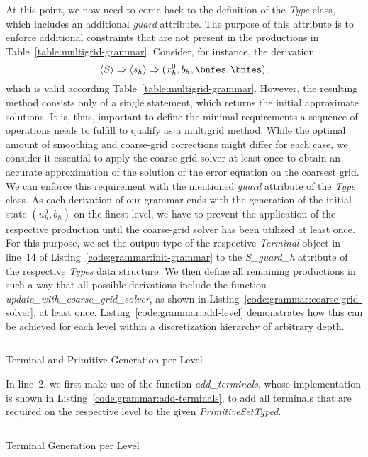 At this point, we now need to come back to the definition of the \emph{Type} class, which includes an additional \emph{guard} attribute.
The purpose of this attribute is to enforce additional constraints that are not present in the productions in Table~\ref{table:multigrid-grammar}.
Consider, for instance, the derivation
\begin{equation*}
\ps{S} \Rightarrow \ps{s_h} \Rightarrow (x_h^0, b_h, \bnfes, \bnfes),
\end{equation*}
which is valid according Table~\ref{table:multigrid-grammar}.
However, the resulting method consists only of a single statement, which returns the initial approximate solutions.
It is, thus, important to define the minimal requirements a sequence of operations needs to fulfill to qualify as a multigrid method. 
While the optimal amount of smoothing and coarse-grid corrections might differ for each case, we consider it essential to apply the coarse-grid solver at least once to obtain an accurate approximation of the solution of the error equation on the coarsest grid.
We can enforce this requirement with the mentioned \emph{guard} attribute of the \emph{Type} class.
As each derivation of our grammar ends with the generation of the initial state $\left(u_h^0, b_h\right)$ on the finest level, we have to prevent the application of the respective production until the coarse-grid solver has been utilized at least once.
For this purpose, we set the output type of the respective \emph{Terminal} object in line~14 of Listing~\ref{code:grammar:init-grammar} to the \emph{S\_guard\_h} attribute of the respective \emph{Types} data structure.
We then define all remaining productions in such a way that all possible derivations include the function \emph{update\_with\_coarse\_grid\_solver}, as shown in Listing~\ref{code:grammar:coarse-grid-solver}, at least once.
Listing~\ref{code:grammar:add-level} demonstrates how this can be achieved for each level within a discretization hierarchy of arbitrary depth.
\begin{listing}
	\inputminted[linenos]{python}{evostencils/grammar/add_level.py}
	\caption{Terminal and Primitive Generation per Level}
	\label{code:grammar:add-level}
\end{listing}
In line~2, we first make use of the function \emph{add\_terminals}, whose implementation is shown in Listing~\ref{code:grammar:add-terminals}, to add all terminals that are required on the respective level to the given \emph{PrimitiveSetTyped}.
\begin{listing}
	\inputminted{python}{evostencils/grammar/add_terminals.py}
	\caption{Terminal Generation per Level}
	\label{code:grammar:add-terminals}
\end{listing}
